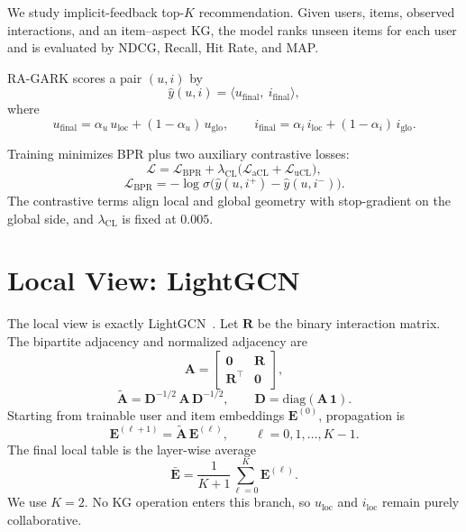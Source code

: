 We study implicit-feedback top-$K$ recommendation. Given users, items, observed interactions, and an item--aspect KG, the model ranks unseen items for each user and is evaluated by NDCG, Recall, Hit Rate, and MAP.

RA-GARK scores a pair $(u,i)$ by
\begin{equation}
\label{eq:score}
\hat{y}(u, i) = \langle u_{\mathrm{final}},\ i_{\mathrm{final}} \rangle,
\end{equation}
where
\begin{equation}
\label{eq:fusion}
u_{\mathrm{final}} = \alpha_u\, u_{\mathrm{loc}} + (1 - \alpha_u)\, u_{\mathrm{glo}}, \qquad
i_{\mathrm{final}} = \alpha_i\, i_{\mathrm{loc}} + (1 - \alpha_i)\, i_{\mathrm{glo}}.
\end{equation}

Training minimizes BPR plus two auxiliary contrastive losses:
\begin{equation}
\label{eq:total-loss}
\mathcal{L} = \mathcal{L}_{\mathrm{BPR}} + \lambda_{\mathrm{CL}} \bigl( \mathcal{L}_{\mathrm{aCL}} + \mathcal{L}_{\mathrm{uCL}} \bigr),
\end{equation}
\begin{equation}
\label{eq:bpr}
\mathcal{L}_{\mathrm{BPR}} = - \log \sigma\bigl( \hat{y}(u, i^+) - \hat{y}(u, i^-) \bigr).
\end{equation}
The contrastive terms align local and global geometry with stop-gradient on the global side, and $\lambda_{\mathrm{CL}}$ is fixed at $0.005$.

\section{Local View: LightGCN}
\label{sec:local}

The local view is exactly LightGCN~\cite{he2020lightgcn}. Let $\mathbf{R}$ be the binary interaction matrix. The bipartite adjacency and normalized adjacency are
\begin{equation}
\label{eq:bipartite-A}
\mathbf{A} = \begin{bmatrix} \mathbf{0} & \mathbf{R} \\ \mathbf{R}^{\top} & \mathbf{0} \end{bmatrix},
\end{equation}
\begin{equation}
\label{eq:normalized-A}
\tilde{\mathbf{A}} = \mathbf{D}^{-1/2}\, \mathbf{A}\, \mathbf{D}^{-1/2}, \qquad \mathbf{D} = \mathrm{diag}\!\left(\mathbf{A}\,\mathbf{1}\right).
\end{equation}
Starting from trainable user and item embeddings $\mathbf{E}^{(0)}$, propagation is
\begin{equation}
\label{eq:lightgcn-prop}
\mathbf{E}^{(\ell+1)} = \tilde{\mathbf{A}}\, \mathbf{E}^{(\ell)}, \qquad \ell = 0, 1, \dots, K-1.
\end{equation}
The final local table is the layer-wise average
\begin{equation}
\label{eq:lightgcn-avg}
\bar{\mathbf{E}} = \frac{1}{K+1} \sum_{\ell=0}^{K} \mathbf{E}^{(\ell)}.
\end{equation}
We use $K=2$. No KG operation enters this branch, so $u_{\mathrm{loc}}$ and $i_{\mathrm{loc}}$ remain purely collaborative.

